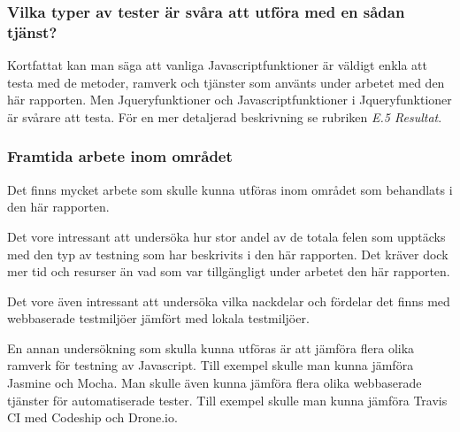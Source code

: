 \subsubsection{Vilka typer av tester är svåra att utföra 
med en sådan tjänst?}
Kortfattat kan man säga att vanliga Javascriptfunktioner är
väldigt enkla att testa med de metoder, ramverk och tjänster som
använts under arbetet med den här rapporten. Men Jqueryfunktioner och
Javascriptfunktioner i Jqueryfunktioner är svårare att
testa. För en mer detaljerad beskrivning se rubriken \emph{E.5 Resultat}.

\subsubsection{Framtida arbete inom området}
Det finns mycket arbete som skulle kunna utföras inom området som behandlats
i den här rapporten.

Det vore intressant att undersöka hur stor andel av de totala felen
som upptäcks med den typ av testning som har beskrivits i den här rapporten.
Det kräver dock mer tid och resurser än vad som var tillgängligt under
arbetet den här rapporten.

Det vore även intressant att undersöka vilka nackdelar och fördelar det
finns med webbaserade testmiljöer jämfört med lokala
testmiljöer.

En annan undersökning som skulla kunna utföras är att jämföra
flera olika ramverk för testning av Javascript. Till exempel skulle
man kunna jämföra Jasmine och Mocha. Man skulle även kunna jämföra
flera olika webbaserade tjänster för automatiserade tester. Till
exempel skulle man kunna jämföra Travis CI med Codeship och Drone.io.




